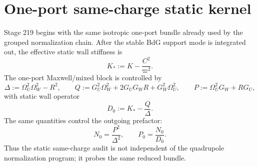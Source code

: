 \section{One-port same-charge static kernel}
\label{sec:part07_same_charge_rigid_mouth:one-port-same-charge-static-kernel}

Stage 219 begins with the same isotropic one-port bundle already used by the grouped normalization chain.  After the stable BdG support mode is integrated out, the effective static wall stiffness is
\begin{equation}
\label{eq:part07-kstar}
K_*:=K-\frac{C^2}{\varpi^2}.
\end{equation}
The one-port Maxwell/mixed block is controlled by
\begin{equation}
\label{eq:part07-static-delta-qp}
\Delta:=\Omega_U^2\Omega_W^2-R^2,
\qquad
Q:=G_U^2\Omega_W^2+2G_UG_WR+G_W^2\Omega_U^2,
\qquad
P:=\Omega_U^2G_W+RG_U,
\end{equation}
with static wall operator
\begin{equation}
\label{eq:part07-static-d0}
D_0:=K_* - \frac{Q}{\Delta}.
\end{equation}
The same quantities control the outgoing prefactor:
\begin{equation}
\label{eq:part07-static-n0-p0}
N_0=\frac{P^2}{\Delta^2},
\qquad
P_0=\frac{N_0}{D_0}.
\end{equation}
Thus the static same-charge audit is not independent of the quadrupole normalization program; it probes the same reduced bundle.

